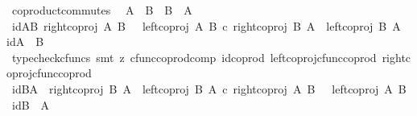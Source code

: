 \begin{isabellebody}
\endisatagproof
{\isafoldproof}%
%
\isadelimproof
%
\endisadelimproof
%
\isadelimdocument
%
\endisadelimdocument
%
\isatagdocument
%
\isamarkuptrue%
%
\endisatagdocument
{\isafolddocument}%
%
\isadelimdocument
%
\endisadelimdocument
{}\isamarkupfalse%
\ coproduct{\isacharunderscore}{\kern0pt}commutes{\isacharcolon}{\kern0pt}\isanewline
\ \ {\isachardoublequoteopen}A\ {\isasymCoprod}\ B\ {\isasymcong}\ B\ {\isasymCoprod}\ A{\isachardoublequoteclose}\isanewline
%
\isadelimproof
%
\endisadelimproof
%
\isatagproof
{}\isamarkupfalse%
\ {\isacharminus}{\kern0pt}\isanewline
\ \ \isamarkupfalse%
\ id{\isacharunderscore}{\kern0pt}AB{\isacharcolon}{\kern0pt}\ {\isachardoublequoteopen}{\isacharparenleft}{\kern0pt}{\isacharparenleft}{\kern0pt}right{\isacharunderscore}{\kern0pt}coproj\ A\ B{\isacharparenright}{\kern0pt}\ \ {\isasymamalg}\ {\isacharparenleft}{\kern0pt}left{\isacharunderscore}{\kern0pt}coproj\ A\ B{\isacharparenright}{\kern0pt}{\isacharparenright}{\kern0pt}\ {\isasymcirc}\isactrlsub c\ {\isacharparenleft}{\kern0pt}{\isacharparenleft}{\kern0pt}right{\isacharunderscore}{\kern0pt}coproj\ B\ A{\isacharparenright}{\kern0pt}\ {\isasymamalg}\ {\isacharparenleft}{\kern0pt}left{\isacharunderscore}{\kern0pt}coproj\ B\ A{\isacharparenright}{\kern0pt}{\isacharparenright}{\kern0pt}\ {\isacharequal}{\kern0pt}\ id{\isacharparenleft}{\kern0pt}A\ {\isasymCoprod}\ B{\isacharparenright}{\kern0pt}{\isachardoublequoteclose}\isanewline
\ \ \ \ \isamarkupfalse%
\ {\isacharparenleft}{\kern0pt}typecheck{\isacharunderscore}{\kern0pt}cfuncs{\isacharcomma}{\kern0pt}\ smt\ {\isacharparenleft}{\kern0pt}z{}{\isacharparenright}{\kern0pt}\ cfunc{\isacharunderscore}{\kern0pt}coprod{\isacharunderscore}{\kern0pt}comp\ id{\isacharunderscore}{\kern0pt}coprod\ left{\isacharunderscore}{\kern0pt}coproj{\isacharunderscore}{\kern0pt}cfunc{\isacharunderscore}{\kern0pt}coprod\ right{\isacharunderscore}{\kern0pt}coproj{\isacharunderscore}{\kern0pt}cfunc{\isacharunderscore}{\kern0pt}coprod{\isacharparenright}{\kern0pt}\isanewline
\ \ \isamarkupfalse%
\ id{\isacharunderscore}{\kern0pt}BA{\isacharcolon}{\kern0pt}\ {\isachardoublequoteopen}\ {\isacharparenleft}{\kern0pt}{\isacharparenleft}{\kern0pt}right{\isacharunderscore}{\kern0pt}coproj\ B\ A{\isacharparenright}{\kern0pt}\ {\isasymamalg}\ {\isacharparenleft}{\kern0pt}left{\isacharunderscore}{\kern0pt}coproj\ B\ A{\isacharparenright}{\kern0pt}{\isacharparenright}{\kern0pt}\ {\isasymcirc}\isactrlsub c\ {\isacharparenleft}{\kern0pt}{\isacharparenleft}{\kern0pt}right{\isacharunderscore}{\kern0pt}coproj\ A\ B{\isacharparenright}{\kern0pt}\ \ {\isasymamalg}\ {\isacharparenleft}{\kern0pt}left{\isacharunderscore}{\kern0pt}coproj\ A\ B{\isacharparenright}{\kern0pt}{\isacharparenright}{\kern0pt}\ {\isacharequal}{\kern0pt}\ id{\isacharparenleft}{\kern0pt}B\ {\isasymCoprod}\ A{\isacharparenright}{\kern0pt}{\isachardoublequoteclose}\isanewline

\end{isabellebody}
